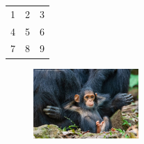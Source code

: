 \documentclass{article}
\begin{document}
\begin{tabular}{ c c c }
1 & 2 & 3 \\
4 & 5 & 6 \\
7 & 8 & 9
\end{tabular}
\begin{figure}[htp]
\includegraphics[width=4cm]{images/monkey.jpg}
\end{figure}
\end{document}
